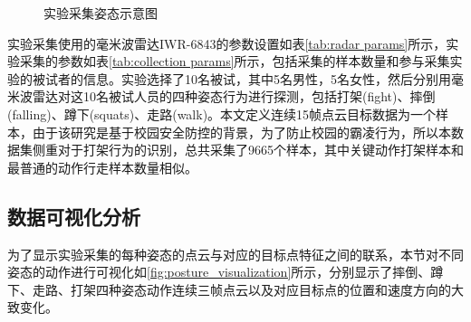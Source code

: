 \begin{figure}[htbp]
	\centering
	\caption{实验采集姿态示意图}
	\label{fig:posture collection}
\end{figure}
实验采集使用的毫米波雷达IWR-6843的参数设置如表\eqref{tab:radar params}所示，实验采集的参数如表\eqref{tab:collection params}所示，包括采集的样本数量和参与采集实验的被试者的信息。实验选择了10名被试，其中5名男性，5名女性，然后分别用毫米波雷达对这10名被试人员的四种姿态行为进行探测，包括打架(fight)、摔倒(falling)、蹲下(squats)、走路(walk)。本文定义连续15帧点云目标数据为一个样本，由于该研究是基于校园安全防控的背景，为了防止校园的霸凌行为，所以本数据集侧重对于打架行为的识别，总共采集了9665个样本，其中关键动作打架样本和最普通的动作行走样本数量相似。


\subsection{数据可视化分析}
为了显示实验采集的每种姿态的点云与对应的目标点特征之间的联系，本节对不同姿态的动作进行可视化如\eqref{fig:posture_visualization}所示，分别显示了摔倒、蹲下、走路、打架四种姿态动作连续三帧点云以及对应目标点的位置和速度方向的大致变化。

